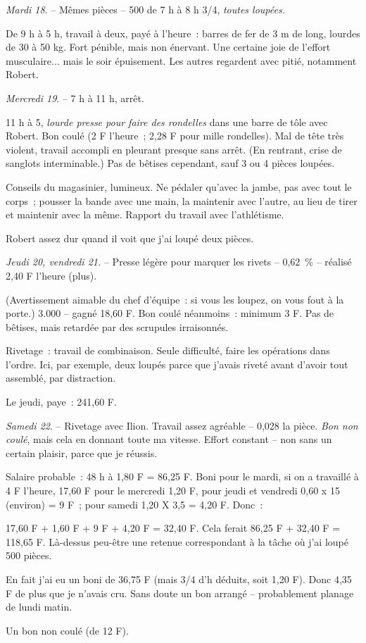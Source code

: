 \documentclass[french,twoside]{book} %
\begin{document}
{\itshape Mardi 18}. – Mêmes pièces – 500 de 7 h à 8 h 3/4, {\itshape toutes loupées.}\par
De 9 h à 5 h, travail à deux, payé à l'heure : barres de fer de 3 m de long, lourdes de 30 à 50 kg. Fort pénible, mais non énervant. Une certaine joie de l'effort musculaire... mais le soir épuisement. Les autres regardent avec pitié, notamment Robert.\par
{\itshape Mercredi 19}. – 7 h à 11 h, arrêt.\par
11 h à 5, {\itshape lourde presse pour faire des rondelles} dans une barre de tôle avec Robert. Bon coulé (2 F l'heure ; 2,28 F pour mille rondelles). Mal de tête très violent, travail accompli en pleurant presque sans arrêt. (En rentrant, crise de sanglots interminable.) Pas de bêtises cependant, sauf 3 ou 4 pièces loupées.\par
Conseils du magasinier, lumineux. Ne pédaler qu'avec la jambe, pas avec tout le corps ; pousser la bande avec une main, la maintenir avec l'autre, au lieu de tirer et maintenir avec la même. Rapport du travail avec l'athlétisme.\par
Robert assez dur quand il voit que j'ai loupé deux pièces.\par
{\itshape Jeudi 20, vendredi 21.} – Presse légère pour marquer les rivets – 0,62 \% – réalisé 2,40 F l'heure (plus).\par
(Avertissement aimable du chef d'équipe : si vous les loupez, on vous fout à la porte.) 3.000 – gagné 18,60 F. Bon coulé néanmoins : minimum 3 F. Pas de bêtises, mais retardée par des scrupules irraisonnés.\par
Rivetage : travail de combinaison. Seule difficulté, faire les opérations dans l'ordre. Ici, par exemple, deux loupés parce que j'avais riveté avant d'avoir tout assemblé, par distraction.\par
Le jeudi, paye : 241,60 F.\par
{\itshape Samedi 22}. – Rivetage avec Ilion. Travail assez agréable – 0,028 la pièce. {\itshape Bon non coulé}, mais cela en donnant toute ma vitesse. Effort constant – non sans un certain plaisir, parce que je réussis.\par
Salaire probable : 48 h à 1,80 F = 86,25 F. Boni pour le mardi, si on a travaillé à 4 F l'heure, 17,60 F pour le mercredi 1,20 F, pour jeudi et vendredi 0,60 x 15 (environ) = 9 F ; pour samedi 1,20 X 3,5 = 4,20 F. Donc :\par
17,60 F + 1,60 F + 9 F + 4,20 F = 32,40 F. Cela ferait 86,25 F + 32,40 F = 118,65 F. Là-dessus peu-être une retenue correspondant à la tâche où j'ai loupé 500 pièces.\par
En fait j'ai eu un boni de 36,75 F (mais 3/4 d'h déduits, soit 1,20 F). Donc 4,35 F de plus que je n'avais cru. Sans doute un bon arrangé – probablement planage de lundi matin.\par
Un bon non coulé (de 12 F).
\end{document}

